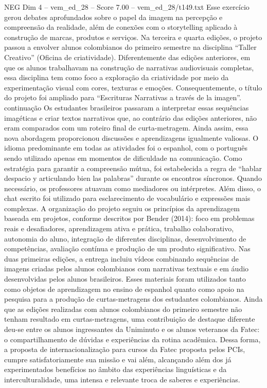 \begin{textsample}{NEG Dim 4 – vem\_ed\_28 – Score 7.00 – vem\_ed\_28/t149.txt}
Esse exercício gerou debates aprofundados sobre o papel da imagem na percepção e compreensão da realidade, além de conexões com o storytelling aplicado à construção de marcas, produtos e serviços.
Na terceira e quarta edições, o projeto passou a envolver alunos colombianos do primeiro semestre na disciplina “Taller Creativo” (Oficina de criatividade).
Diferentemente das edições anteriores, em que os alunos trabalhavam na construção de narrativas audiovisuais completas, essa disciplina tem como foco a exploração da criatividade por meio da experimentação visual com cores, texturas e emoções.
Consequentemente, o título do projeto foi ampliado para “Escrituras Narrativas a través de la imagen”. continuação Os estudantes brasileiros passaram a interpretar essas sequências imagéticas e criar textos narrativos que, ao contrário das edições anteriores, não eram comparados com um roteiro final de curta-metragem.
Ainda assim, essa nova abordagem proporcionou discussões e aprendizagens igualmente valiosas.
O idioma predominante em todas as atividades foi o espanhol, com o português sendo utilizado apenas em momentos de dificuldade na comunicação.
Como estratégia para garantir a compreensão mútua, foi estabelecida a regra de “hablar despacio y articulando bien las palabras” durante os encontros síncronos.
Quando necessário, os professores atuavam como mediadores ou intérpretes.
Além disso, o chat escrito foi utilizado para esclarecimento de vocabulário e expressões mais complexas.
A organização do projeto seguiu os princípios da aprendizagem baseada em projetos, conforme descritos por Bender (2014): foco em problemas reais e desafiadores, aprendizagem ativa e prática, trabalho colaborativo, autonomia do aluno, integração de diferentes disciplinas, desenvolvimento de competências, avaliação contínua e produção de um produto significativo.
Nas duas primeiras edições, a entrega incluiu vídeos combinando sequências de imagens criadas pelos alunos colombianos com narrativas textuais e em áudio desenvolvidas pelos alunos brasileiros.
Esses materiais foram utilizados tanto como objetos de aprendizagem no ensino de espanhol quanto como apoio na pesquisa para a produção de curtas-metragens dos estudantes colombianos.
Ainda que as edições realizadas com alunos colombianos do primeiro semestre não tenham resultado em curtas-metragens, uma contribuição de destaque diferente deu-se entre os alunos ingressantes da Uniminuto e os alunos veteranos da Fatec: o compartilhamento de dúvidas e experiências da rotina acadêmica.
Dessa forma, a proposta de internacionalização para cursos da Fatec proposta pelos PCIs, cumpre satisfatoriamente sua missão e vai além, alcançando além dos já experimentados benefícios no âmbito das experiências linguísticas e da interculturalidade, uma intensa e relevante troca de saberes e experiências.

\end{textsample}
